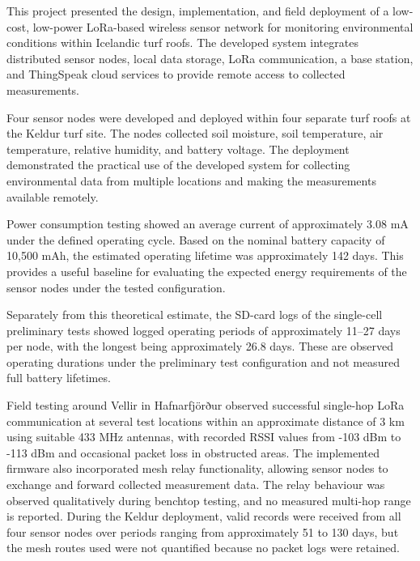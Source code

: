 
This project presented the design, implementation, and field deployment of a low-cost, low-power LoRa-based wireless sensor network for monitoring environmental conditions within Icelandic turf roofs. The developed system integrates distributed sensor nodes, local data storage, LoRa communication, a base station, and ThingSpeak cloud services to provide remote access to collected measurements.

Four sensor nodes were developed and deployed within four separate turf roofs at the Keldur turf site. The nodes collected soil moisture, soil temperature, air temperature, relative humidity, and battery voltage. The deployment demonstrated the practical use of the developed system for collecting environmental data from multiple locations and making the measurements available remotely.

Power consumption testing showed an average current of approximately 3.08 mA under the defined operating cycle. Based on the nominal battery capacity of 10,500 mAh, the estimated operating lifetime was approximately 142 days. This provides a useful baseline for evaluating the expected energy requirements of the sensor nodes under the tested configuration.

Separately from this theoretical estimate, the SD-card logs of the single-cell preliminary tests showed logged operating periods of approximately 11--27 days per node, with the longest being approximately 26.8 days. These are observed operating durations under the preliminary test configuration and not measured full battery lifetimes.

Field testing around Vellir in Hafnarfjörður observed successful single-hop LoRa communication at several test locations within an approximate distance of 3 km using suitable 433 MHz antennas, with recorded RSSI values from -103 dBm to -113 dBm and occasional packet loss in obstructed areas. The implemented firmware also incorporated mesh relay functionality, allowing sensor nodes to exchange and forward collected measurement data. The relay behaviour was observed qualitatively during benchtop testing, and no measured multi-hop range is reported. During the Keldur deployment, valid records were received from all four sensor nodes over periods ranging from approximately 51 to 130 days, but the mesh routes used were not quantified because no packet logs were retained.


